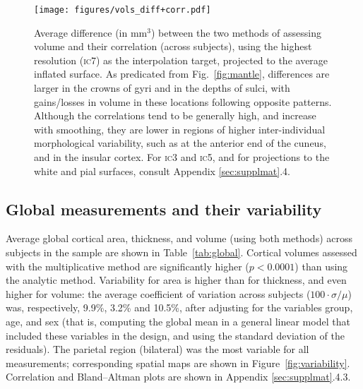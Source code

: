 \begin{figure}[!p]
\begin{center}
\texttt{[image: figures/vols\_diff+corr.pdf]}
\end{center}
\caption[Average difference and correlation between the two methods of assessing volume.]{Average difference (in mm$^3$) between the two methods of assessing volume and their correlation (across subjects), using the highest resolution (\textsc{ic}7) as the interpolation target, projected to the average inflated surface. As predicated from Fig.~\ref{fig:mantle}, differences are larger in the crowns of gyri and in the depths of sulci, with gains/losses in volume in these locations following opposite patterns. Although the correlations tend to be generally high, and increase with smoothing, they are lower in regions of higher inter-individual morphological variability, such as at the anterior end of the cuneus, and in the insular cortex. For \textsc{ic}3 and \textsc{ic5}, and for projections to the white and pial surfaces, consult Appendix \ref{sec:supplmat}.4.}
\label{fig:maps_vols}
\end{figure}

\subsection{Global measurements and their variability}

Average global cortical area, thickness, and volume (using both methods) across subjects in the sample are shown in Table~\ref{tab:global}. Cortical volumes assessed with the multiplicative method are significantly higher ($p < 0.0001$) than using the analytic method. Variability for area is higher than for thickness, and even higher for volume: the average coefficient of variation across subjects ($100\cdot\sigma/\mu$) was, respectively, 9.9\%, 3.2\% and 10.5\%, after adjusting for the variables group, age, and sex (that is, computing the global mean in a general linear model that included these variables in the design, and using the standard deviation of the residuals). The parietal region (bilateral) was the most variable for all measurements; corresponding spatial maps are shown in Figure~\ref{fig:variability}. Correlation and Bland--Altman plots are shown in Appendix \ref{sec:supplmat}.4.3.

